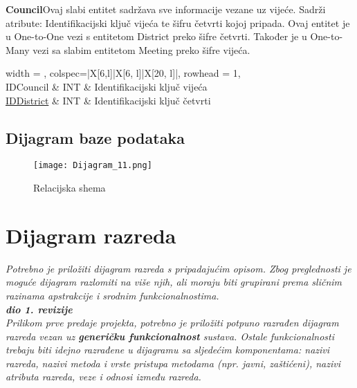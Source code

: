 							
							
							\textbf{\large Council}\quad\quad Ovaj slabi entitet sadržava sve informacije vezane uz vijeće. Sadrži atribute: Identifikacijski ključ vijeća te šifru četvrti kojoj pripada. Ovaj entitet je u One-to-One vezi s entitetom District preko šifre četvrti. Također je u One-to-Many vezi sa slabim entitetom Meeting preko šifre vijeća.
							
							\begin{longtblr}[
					label=none,
					entry=none
					]{
						width = \textwidth,
						colspec={|X[6,l]|X[6, l]|X[20, l]|}, 
						rowhead = 1,
					} %
					\hline {}	 \\ \hline[3pt]
					IDCouncil & INT	&  	Identifikacijski ključ vijeća  	\\ \hline
					\underline{IDDistrict}	 & INT & Identifikacijski ključ četvrti  	\\ \hline
							\end{longtblr}
							
							
			\eject	
			
			\subsection{Dijagram baze podataka}
	\begin{figure}[h]
	\centering
  \hbox{\hspace{-2.2cm}\texttt{[image: Dijagram\_11.png]}}
  \caption{Relacijska shema}
  \label{Relacijska_shema}
\end{figure}
			
			\eject
			
		\section{Dijagram razreda}
		
			\textit{Potrebno je priložiti dijagram razreda s pripadajućim opisom. Zbog preglednosti je moguće dijagram razlomiti na više njih, ali moraju biti grupirani prema sličnim razinama apstrakcije i srodnim funkcionalnostima.}\\
			
			\textbf{\textit{dio 1. revizije}}\\
			
			\textit{Prilikom prve predaje projekta, potrebno je priložiti potpuno razrađen dijagram razreda vezan uz \textbf{generičku funkcionalnost} sustava. Ostale funkcionalnosti trebaju biti idejno razrađene u dijagramu sa sljedećim komponentama: nazivi razreda, nazivi metoda i vrste pristupa metodama (npr. javni, zaštićeni), nazivi atributa razreda, veze i odnosi između razreda.}\\
			
